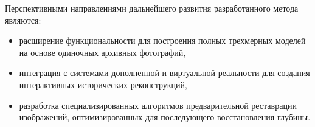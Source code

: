 \begin{essay}{}
    Перспективными направлениями дальнейшего развития разработанного метода являются:
    \begin{itemize}
        \item расширение функциональности для построения полных трехмерных моделей на основе одиночных архивных фотографий,
        \item интеграция с системами дополненной и виртуальной реальности для создания интерактивных исторических реконструкций,
        \item разработка специализированных алгоритмов предварительной реставрации изображений, оптимизированных для последующего восстановления глубины.
    \end{itemize}



%
\end{essay}